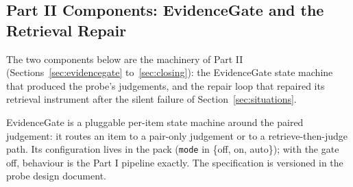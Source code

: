 \documentclass{article} %
\begin{document}
\subsection{Part II Components: EvidenceGate and the Retrieval Repair}
\label{app:code-v2}
The two components below are the machinery of Part II (Sections~\ref{sec:evidencegate} to~\ref{sec:closing}): the EvidenceGate state machine that produced the probe's judgements, and the repair loop that repaired its retrieval instrument after the silent failure of Section~\ref{sec:situations}.

EvidenceGate is a pluggable per-item state machine around the paired judgement: it routes an item to a pair-only judgement or to a retrieve-then-judge path. Its configuration lives in the pack (\texttt{mode} in \{off, on, auto\}); with the gate off, behaviour is the Part I pipeline exactly. The specification is versioned in the probe design document.
\end{document}
